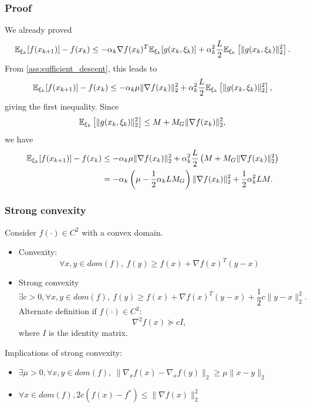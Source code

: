 \documentclass[usepdftitle=false, aspectratio=169]{beamer}
\begin{document}
\begin{frame}
\frametitle{Proof}

We already proved
$$
	{\mathbb{E}}_{\xi_k} [f(x_{k+1})] - f(x_k) \leq - \alpha_k \nabla f(x_k)^T {\mathbb{E}}_{\xi_k} [ g(x_k, \xi_k) ] + \alpha_k^2 \frac{L}{2} {\mathbb{E}}_{\xi_k} \left[ \| g(x_k, \xi_k) \|^2_2 \right].	
$$
From \ref{ass:sufficient_descent}, this leads to
$$
{\mathbb{E}}_{\xi_k} [f(x_{k+1})] - f(x_k) \leq - \alpha_k \mu \| \nabla f(x_k) \|_2^2 + \alpha_k^2 \frac{L}{2} {\mathbb{E}}_{\xi_k} \left[ \| g(x_k, \xi_k) \|^2_2 \right],
$$
giving the first inequality. Since
$$
{\mathbb{E}}_{\xi_k} \left[ \| g(x_k, \xi_k) \|^2_2 \right] \leq M + M_G \| \nabla f(x_k) \|_2^2,
$$
we have
\begin{align*}
{\mathbb{E}}_{\xi_k} [f(x_{k+1})] - f(x_k) & \leq - \alpha_k \mu \| \nabla f(x_k) \|_2^2 + \alpha_k^2 \frac{L}{2} \left( M + M_G \| \nabla f(x_k) \|_2^2 \right) \\
& =  - \alpha_k \left( \mu - \frac{1}{2} \alpha_k L M_G \right) \| \nabla f(x_k) \|_2^2 + \frac{1}{2} \alpha_k^2 LM.
\end{align*}

\end{frame}

\begin{frame}
\frametitle{Strong convexity}

Consider $f(\cdot) \in C^2$ with a convex domain.
\begin{itemize}
	\item Convexity:
	$$
	\forall x, y \in dom(f),\ f(y) \geq f(x) + \nabla f(x)^T(y-x)
	$$
	\item Strong convexity
	\begin{equation}
	\exists c > 0, \forall x, y \in dom(f),\ f(y) \geq f(x) + \nabla f(x)^T(y-x) + \frac{1}{2} c \| y - x \|^2_2.
	\tag{A.8}
	\label{ass:strong_convexity}
	\end{equation}
	Alternate definition if $f(\cdot) \in C^2$:
	$$
	\nabla^2 f(x) \succeq cI,
	$$
	where $I$ is the identity matrix.
\end{itemize}

Implications of strong convexity:
\begin{itemize}
	\item
	$\exists \mu > 0, \forall x, y \in dom(f),\ \| \nabla_x f(x) - \nabla_x f(y) \|_2 \geq \mu \| x - y \|_2$
	\item
	$\forall x \in dom(f), 2c (f(x) - f^*) \leq \| \nabla f(x) \|_2^2$
\end{itemize}

\end{frame}
\end{document}
